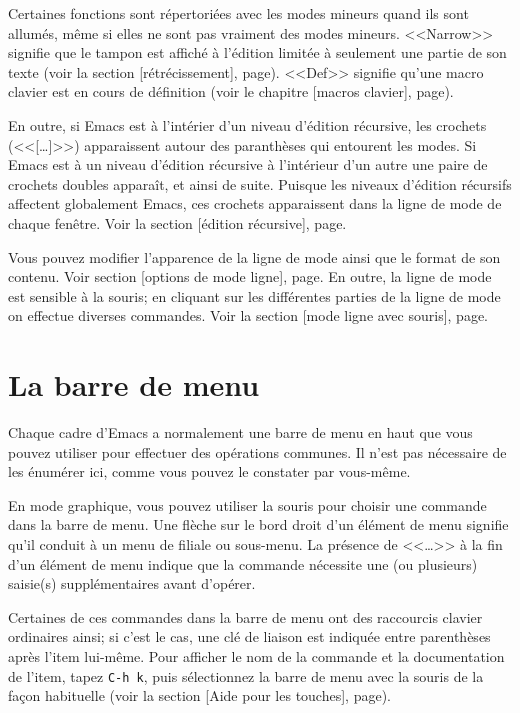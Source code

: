 Certaines fonctions sont répertoriées avec les modes mineurs quand ils
sont allumés, même si elles ne sont pas vraiment des modes
mineurs. <<Narrow>> signifie que le tampon est affiché à l'édition
limitée à seulement une partie de son texte (voir la
section [rétrécissement],
page). <<Def>> signifie qu'une macro clavier est
en cours de définition (voir le chapitre [macros
clavier], page).\par 

En outre, si Emacs est à l'intérier d'un niveau d'édition récursive,
les crochets (<<[\dots{}]>>) apparaissent autour des paranthèses qui
entourent les modes. Si Emacs est à un niveau d'édition récursive à
l'intérieur d'un autre une paire de crochets doubles apparaît, et
ainsi de suite. Puisque les niveaux d'édition récursifs affectent
globalement Emacs, ces crochets apparaissent dans la ligne de mode de
chaque fenêtre. Voir la section [édition récursive],
page.\par 

Vous pouvez modifier l'apparence de la ligne de mode ainsi que le
format de son contenu. Voir section [options de mode
ligne], page. En outre, la ligne de mode est
sensible à la souris; en cliquant sur les différentes parties de la
ligne de mode on effectue diverses commandes. Voir la
section [mode ligne avec souris],
page.\par
 

\section{La barre de menu}
Chaque cadre d'Emacs a normalement une barre de menu en haut que vous
pouvez utiliser pour effectuer des opérations communes. Il n'est pas
nécessaire de les énumérer ici, comme vous pouvez le constater par
vous-même. \par

En mode graphique, vous pouvez utiliser la souris pour choisir une
commande dans la barre de menu. Une flèche sur le bord droit d'un
élément de menu signifie qu'il conduit à un menu de filiale ou
sous-menu. La présence de <<\dots{}>> à la fin d'un élément de menu
indique que la commande nécessite une (ou plusieurs) saisie(s)
supplémentaires avant d'opérer.\par 

Certaines de ces commandes dans la barre de menu ont des raccourcis
clavier ordinaires ainsi; si c'est le cas, une clé de liaison est
indiquée entre parenthèses après l'item lui-même. Pour afficher le nom
de la commande et la documentation de l'item, tapez \texttt{C-h k},
puis sélectionnez la barre de menu avec la souris de la façon
habituelle (voir la section [Aide pour les touches],
page). \par 

